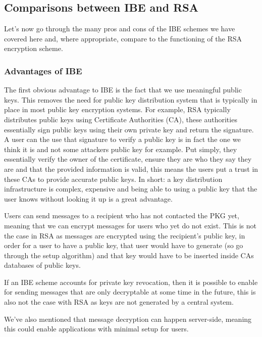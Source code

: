 \documentclass[conference]{IEEEtran}
\begin{document}
\subsection{Comparisons between IBE and RSA}
Let's now go through the many pros and cons of the IBE schemes we 
have covered here and, where appropriate, compare to the functioning of the 
RSA encryption scheme.


\subsubsection{Advantages of IBE}
The first obvious advantage to IBE is the fact that we use 
meaningful public keys. This removes the need for public key distribution system
that is typically in place in most public key encryption systems. For example,
RSA typically distributes public keys using Certificate Authorities (CA), these authorities
essentially sign public keys using their own private key and return the signature. A user
can the use that signature to verify a public key is in fact the one we think it is 
and not some attackers public key for example. Put simply, 
they essentially verify the owner of the certificate, 
ensure they are who they say they are and that the provided information is valid, this
means the users put a trust in these CAs to provide accurate public keys.
In short: a key distribution infrastructure is complex, expensive and being able to 
using a public key that the user knows without looking it up is a great advantage.


Users can send messages to a recipient who has not contacted the PKG yet, meaning that 
we can encrypt messages for users who yet do not exist. This is not the case in RSA
as messages are encrypted using the recipient's public key, in order for a user to have a 
public key, that user would have to generate (so go through the setup algorithm) and 
that key would have to be inserted inside CAs databases of public keys.

If an IBE scheme accounts for private key revocation, then it is possible to enable for 
sending messages that are only decryptable at some time in the future, this is also not the 
case with RSA as keys are not generated by a central system.


We've also mentioned that message decryption can happen server-side, meaning 
this could enable applications with minimal setup for users.
 
\end{document}
